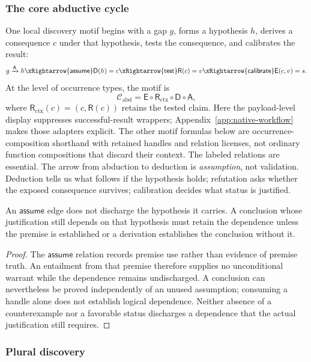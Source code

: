\subsubsection{The core abductive cycle}

One local discovery motif begins with a gap $g$, forms a hypothesis $h$,
derives a consequence $c$ under that hypothesis, tests the consequence, and
calibrates the result:
\[
  g\xrightarrow{\mathsf{A}}h
  \xRightarrow{\mathsf{assume}}
  \mathsf{D}(h)=c
  \xRightarrow{\mathsf{test}}
  \mathsf{R}(c)=v
  \xRightarrow{\mathsf{calibrate}}
  \mathsf{E}(c,v)=s.
\]
At the level of occurrence types, the motif is
\[
  \mathcal{C}_{\mathrm{abd}}
  =\mathsf{E}\circ\mathsf{R}_{\mathrm{ctx}}\circ\mathsf{D}\circ\mathsf{A},
\]
where $\mathsf{R}_{\mathrm{ctx}}(c)=(c,\mathsf{R}(c))$ retains the tested claim. Here the payload-level display suppresses successful-result wrappers; Appendix~\ref{app:native-workflow} makes those adapters explicit. The other motif formulas below are occurrence-composition shorthand with retained handles and relation licenses, not ordinary function compositions that discard their context. The labeled relations are essential. The arrow from abduction to deduction
is \emph{assumption}, not validation. Deduction tells us what follows if the
hypothesis holds; refutation asks whether the exposed consequence survives;
calibration decides what status is justified.

\begin{proposition}
An $\mathsf{assume}$ edge does not discharge the hypothesis it carries. A
conclusion whose justification still depends on that hypothesis must retain the
dependence unless the premise is established or a derivation establishes the
conclusion without it.
\end{proposition}

\begin{proof}
The $\mathsf{assume}$ relation records premise use rather than evidence of premise
truth. An entailment from that premise therefore supplies no unconditional warrant
while the dependence remains undischarged. A conclusion can nevertheless be proved
independently of an unused assumption; consuming a handle alone does not establish
logical dependence. Neither absence of a counterexample nor a favorable status
discharges a dependence that the actual justification still requires.
\end{proof}

\subsubsection{Plural discovery}


